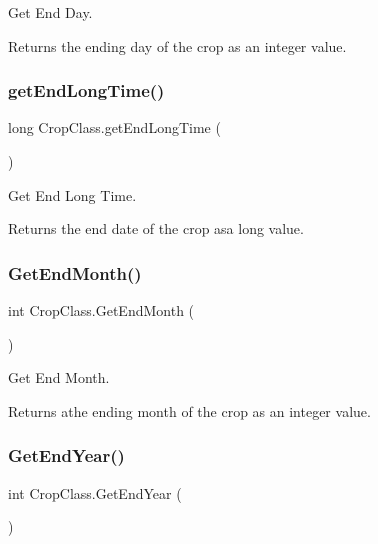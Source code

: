 Get End Day. 

\begin{DoxyReturn}{Returns}
the ending day of the crop as an integer value. 
\end{DoxyReturn}
\mbox{\label{class_crop_class_a29df37044f2b763fac4677714a1fbe47}} 
\subsubsection{\texorpdfstring{getEndLongTime()}{getEndLongTime()}}
{\footnotesize\ttfamily long Crop\+Class.\+get\+End\+Long\+Time (\begin{DoxyParamCaption}{ }\end{DoxyParamCaption})\hspace{0.3cm}{\ttfamily [inline]}}



Get End Long Time. 

\begin{DoxyReturn}{Returns}
the end date of the crop asa long value. 
\end{DoxyReturn}
\mbox{\label{class_crop_class_a243b6f49a2b3b5214282130e06907f3c}} 
\subsubsection{\texorpdfstring{GetEndMonth()}{GetEndMonth()}}
{\footnotesize\ttfamily int Crop\+Class.\+Get\+End\+Month (\begin{DoxyParamCaption}{ }\end{DoxyParamCaption})\hspace{0.3cm}{\ttfamily [inline]}}



Get End Month. 

\begin{DoxyReturn}{Returns}
athe ending month of the crop as an integer value. 
\end{DoxyReturn}
\mbox{\label{class_crop_class_a580b5cfd5209f277d28159a7147084c1}} 
\subsubsection{\texorpdfstring{GetEndYear()}{GetEndYear()}}
{\footnotesize\ttfamily int Crop\+Class.\+Get\+End\+Year (\begin{DoxyParamCaption}{ }\end{DoxyParamCaption})\hspace{0.3cm}{\ttfamily [inline]}}



